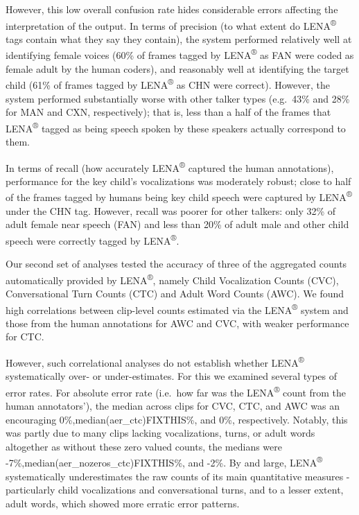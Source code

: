 \documentclass[english,table,man,floatsintext]{apa6}
\begin{document}
However, this low overall confusion rate hides considerable errors affecting the interpretation of the output. In terms of precision (to what extent do LENA\textsuperscript{®} tags contain what they say they contain), the system performed relatively well at identifying female voices (60\% of frames tagged by LENA\textsuperscript{®} as FAN were coded as female adult by the human coders), and reasonably well at identifying the target child (61\% of frames tagged by LENA\textsuperscript{®} as CHN were correct). However, the system performed substantially worse with other talker types (e.g.~43\% and 28\% for MAN and CXN, respectively); that is, less than a half of the frames that LENA\textsuperscript{®} tagged as being speech spoken by these speakers actually correspond to them.

In terms of recall (how accurately LENA\textsuperscript{®} captured the human annotations), performance for the key child's vocalizations was moderately robust; close to half of the frames tagged by humans being key child speech were captured by LENA\textsuperscript{®} under the CHN tag. However, recall was poorer for other talkers: only 32\% of adult female near speech (FAN) and less than 20\% of adult male and other child speech were correctly tagged by LENA\textsuperscript{®}.

Our second set of analyses tested the accuracy of three of the aggregated counts automatically provided by LENA\textsuperscript{®}, namely Child Vocalization Counts (CVC), Conversational Turn Counts (CTC) and Adult Word Counts (AWC). We found high correlations between clip-level counts estimated via the LENA\textsuperscript{®} system and those from the human annotations for AWC and CVC, with weaker performance for CTC.

However, such correlational analyses do not establish whether LENA\textsuperscript{®} systematically over- or under-estimates. For this we examined several types of error rates. For absolute error rate (i.e.~how far was the LENA\textsuperscript{®} count from the human annotators'), the median across clips for CVC, CTC, and AWC was an encouraging 0\%,median(aer\_ctc)FIXTHIS\%, and 0\%, respectively. Notably, this was partly due to many clips lacking vocalizations, turns, or adult words altogether as without these zero valued counts, the medians were -7\%,median(aer\_nozeros\_ctc)FIXTHIS\%, and -2\%. By and large, LENA\textsuperscript{®} systematically underestimates the raw counts of its main quantitative measures - particularly child vocalizations and conversational turns, and to a lesser extent, adult words, which showed more erratic error patterns.
\end{document}
